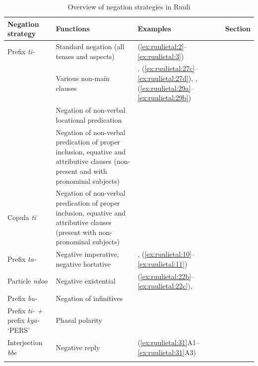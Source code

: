 \documentclass[output=paper,colorlinks,citecolor=brown,draftmode]{langscibook}
\begin{document}
\begin{table}
\small
\begin{tabularx}{\textwidth}{p{23mm}Qp{23mm}l}
\lsptoprule
{\bfseries Negation strategy} & {\bfseries Functions} & {\bfseries Examples} & \textbf{Section}\\
\midrule
Prefix \textit{ti-} & Standard negation (all tenses and aspects) & (\ref{ex:ruulietal:2}--\ref{ex:ruulietal:3}) & \\
& Various non-main clauses & , (\ref{ex:ruulietal:27c}--\ref{ex:ruulietal:27d}), , (\ref{ex:ruulietal:29a}--\ref{ex:ruulietal:29b}) & \\
& Negation of non-verbal locational predication &  & \\
& Negation of non-verbal predication of proper inclusion, equative and attributive clauses (non-present and with pronominal subjects) &  & \\
\midrule 
Copula \textit{ti}  & Negation of non-verbal predication of proper inclusion, equative and attributive clauses (present with non-pronominal subjects) &  & \\
\midrule 
Prefix \textit{ta-} & Negative imperative, negative hortative & , (\ref{ex:ruulietal:10}--\ref{ex:ruulietal:11}) & \\
\midrule 
Particle \textit{ndoo} & Negative existential & (\ref{ex:ruulietal:22b}--\ref{ex:ruulietal:22c}),  & \\
\midrule 
Prefix \textit{bu-} & Negation of infinitives &  & \\
\midrule 
Prefix \textit{ti- +} prefix \textit{kya-} ‘PERS’ & Phasal polarity &  & \\
\midrule 
Interjection \textit{bbe} & Negative reply & (\ref{ex:ruulietal:31}A1--\ref{ex:ruulietal:31}A3) & \\
\lspbottomrule
\end{tabularx}
\caption{Overview of negation strategies in Ruuli}
\label{tab:ruulietal:3}
\end{table}
\end{document}

